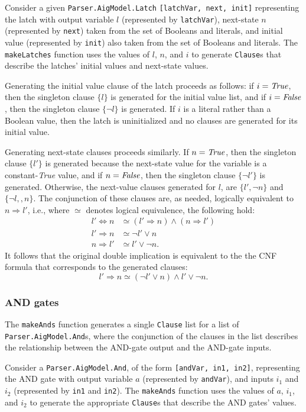 \documentclass[12pt,a4paper,twoside,openright]{report}
\begin{document}
{Consider a given \verb,Parser.AigModel.Latch, \verb.[latchVar, next, init]. representing the latch with
output variable $l$ (represented by \verb,latchVar,), next-state $n$ (represented
by \verb,next,) taken from the set of Booleans and literals, and initial value (represented by \verb,init,)
also taken from the set of Booleans and literals. The \verb,makeLatches, function uses the
values of $l$, $n$, and $i$ to generate \verb,Clause,s that describe the latches' initial values and
next-state values.

Generating the initial value clause of the latch proceeds as follows: if $i = {\it True}$,
then the singleton clause $\{l\}$ is generated for the initial value list, and if $i = {\it False}$,
then the singleton clause $\{\neg l\}$ is generated.
If $i$ is a literal rather than a Boolean value, then the latch is
uninitialized and no clauses are generated for its initial value.

Generating next-state clauses proceeds similarly. If $n = {\it True}$, then the singleton clause
$\{l'\}$ is generated because the next-state value for the variable is a constant-{\it True} value,
and if $n = {\it False}$, then the singleton clause $\{\neg l'\}$ is generated.
Otherwise, the next-value clauses generated for $l$, are $\{l', \neg n\}$
and $\{\neg l,, n\}$. The conjunction of these clauses are, as needed, logically equivalent
to $n \Rightarrow l'$, i.e., where $\simeq$ denotes logical equivalence,
the following hold:
\begin{align*}
l' \Leftrightarrow n &\simeq (l' \Rightarrow n) \wedge (n \Rightarrow l')\\
l' \Rightarrow n &\simeq \neg l' \vee n\\
n \Rightarrow l' &\simeq l' \vee \neg n.
\end{align*}
It follows that the original double implication is equivalent to the 
the CNF formula that corresponds to the generated clauses:
$$l' \Rightarrow n \simeq (\neg l' \vee n) \wedge l' \vee \neg n.$$

\subsubsection{AND gates}
The \verb,makeAnds, function generates a single \verb,Clause, list for a list of \verb,Parser.AigModel.And,s,
where the conjunction of the clauses in the list describes the relationship between the AND-gate output
and the AND-gate inputs.

Consider a \verb,Parser.AigModel.And,, of the form \verb.[andVar, in1, in2]., representing the AND gate
with output variable $a$ (represented by \verb,andVar,), and inputs $i_1$ and $i_2$ (represented by \verb,in1,
and \verb,in2,). The \verb,makeAnds, function uses the values of $a$, $i_1$, and $i_2$ to generate the appropriate
\verb,Clause,s that describe the AND gates' values.

}
\end{document}
